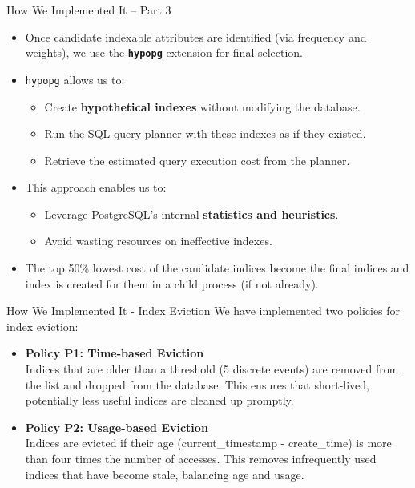 \documentclass[Serif, 10pt, brown]{beamer}
\theoremstyle{example}
\theoremstyle{plain}
\begin{document}
\begin{frame}{How We Implemented It – Part 3}
	\begin{itemize}
		\item Once candidate indexable attributes are identified (via frequency and weights), we use the \textbf{\texttt{hypopg}} extension for final selection.
		
		\item \texttt{hypopg} allows us to:
		\begin{itemize}
			\item Create \textbf{hypothetical indexes} without modifying the database.
			\item Run the SQL query planner with these indexes as if they existed.
			\item Retrieve the estimated query execution cost from the planner.
		\end{itemize}
	
		\item This approach enables us to:
		\begin{itemize}
			\item Leverage PostgreSQL’s internal \textbf{statistics and heuristics}.
			\item Avoid wasting resources on ineffective indexes.
		\end{itemize}
	
		\item The top 50\% lowest cost of the candidate indices become the final indices and index is created for them in a child process (if not already).
	\end{itemize}
\end{frame}

	

\begin{frame}{How We Implemented It - Index Eviction}
    We have implemented two policies for index eviction:
    \begin{itemize}
        \item \textbf{Policy P1: Time-based Eviction} \\
        Indices that are older than a threshold (5 discrete events) are removed from the list and dropped from the database. This ensures that short-lived, potentially less useful indices are cleaned up promptly.

        \item \textbf{Policy P2: Usage-based Eviction} \\
        Indices are evicted if their age (current\_timestamp - create\_time) is more than four times the number of accesses. This removes infrequently used indices that have become stale, balancing age and usage.
    \end{itemize}
\end{frame}
\end{document}
